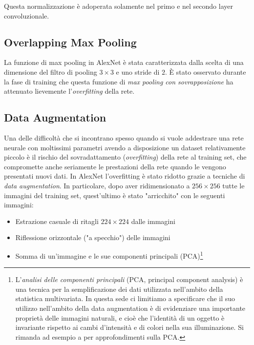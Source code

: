Questa normalizzazione è adoperata solamente nel primo e nel secondo layer convoluzionale.

\subsection*{Overlapping Max Pooling}
La funzione di max pooling in AlexNet è stata caratterizzata dalla scelta di una dimensione del filtro di pooling $3\times 3$ e uno stride di $2$. È stato osservato durante la fase di training che questa funzione di \textit{max pooling con sovrapposizione} ha attenuato lievemente l'\textit{overfitting} della rete.

\subsection*{Data Augmentation}
Una delle difficoltà che si incontrano spesso quando si vuole addestrare una rete neurale con moltissimi parametri avendo a disposizione un dataset relativamente piccolo è il rischio del sovradattamento (\textit{overfitting}) della rete al training set, che compromette anche seriamente le prestazioni della rete quando le vengono presentati nuovi dati.
In AlexNet l'overfitting è stato ridotto grazie a tecniche di \textit{data augmentation}. In particolare, dopo aver ridimensionato a $256\times 256$ tutte le immagini del training set, quest'ultimo è stato "arricchito" con le seguenti immagini:
\begin{itemize}
\item Estrazione casuale di ritagli $224\times 224$ dalle immagini
\item Riflessione orizzontale ("a specchio") delle immagini
\item Somma di un'immagine e le sue componenti principali (PCA)\footnote{L'\textit{analisi delle componenti principali} (PCA, principal component analysis) è una tecnica per la semplificazione dei dati utilizzata nell'ambito della statistica multivariata. In questa sede ci limitiamo a specificare che il suo utilizzo nell'ambito della data augmentation è di evidenziare una importante proprietà delle immagini naturali, e cioè che l'identità di un oggetto è invariante rispetto ai cambi d'intensità e di colori nella sua illuminazione. Si rimanda ad esempio a \cite{PCA} per approfondimenti sulla PCA.}
\end{itemize}

